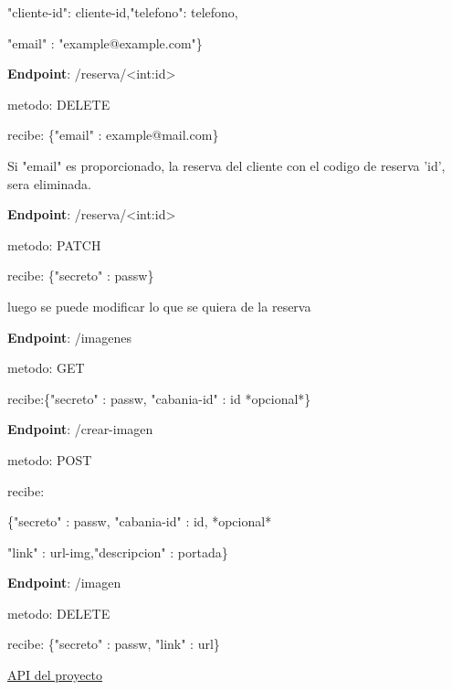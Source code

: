 "cliente-id": cliente-id,"telefono": telefono,

"email" : "example@example.com"\}


\textbf{Endpoint}: /reserva/<int:id>

metodo: DELETE

recibe:
\{"email" : example@mail.com\}

Si "email" es proporcionado, la reserva del cliente con el codigo de reserva 'id', sera eliminada.


\textbf{Endpoint}: /reserva/<int:id>

metodo: PATCH

recibe: \{"secreto" : passw\}

luego se puede modificar lo que se quiera de la reserva


\textbf{Endpoint}: /imagenes

metodo: GET

recibe:\{"secreto" : passw, "cabania-id" : id *opcional*\}

\textbf{Endpoint}: /crear-imagen

metodo: POST

recibe:

\{"secreto" : passw, "cabania-id" : id, *opcional*

"link" : url-img,"descripcion" : portada\}

\textbf{Endpoint}: /imagen

metodo: DELETE

recibe: \{"secreto" : passw, "link" : url\}

\href{https://github.com/MaxiFttInst/UBA_TP_IDS/blob/api/api/app.py}{API del proyecto}


























